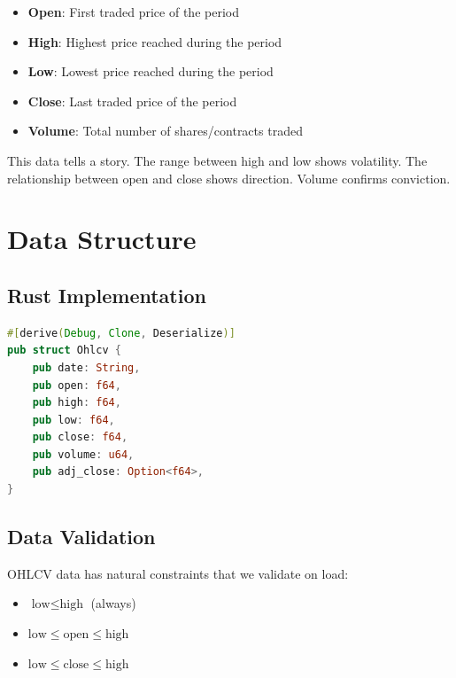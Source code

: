 \begin{itemize}
    \item \textbf{Open}: First traded price of the period
    \item \textbf{High}: Highest price reached during the period
    \item \textbf{Low}: Lowest price reached during the period
    \item \textbf{Close}: Last traded price of the period
    \item \textbf{Volume}: Total number of shares/contracts traded
\end{itemize}

This data tells a story. The range between high and low shows volatility. The
relationship between open and close shows direction. Volume confirms conviction.

\section{Data Structure}

\subsection{Rust Implementation}

\begin{lstlisting}[language=Rust]
#[derive(Debug, Clone, Deserialize)]
pub struct Ohlcv {
    pub date: String,
    pub open: f64,
    pub high: f64,
    pub low: f64,
    pub close: f64,
    pub volume: u64,
    pub adj_close: Option<f64>,
}
\end{lstlisting}


\subsection{Data Validation}

OHLCV data has natural constraints that we validate on load:

\begin{itemize}
    \item $\text{low} \leq \text{high}$ (always)
    \item $\text{low} \leq \text{open} \leq \text{high}$
    \item $\text{low} \leq \text{close} \leq \text{high}$
\end{itemize}

